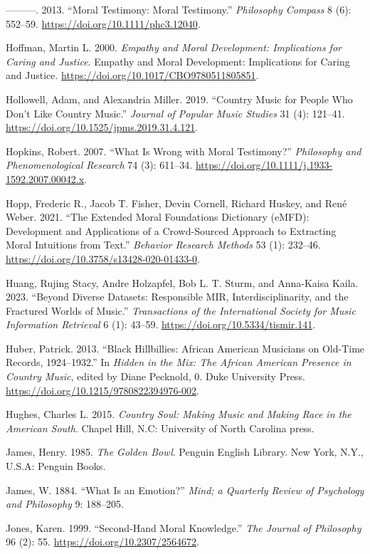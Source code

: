 \documentclass[
  letterpaper,
  DIV=11,
  numbers=noendperiod]{scrartcl}
\theoremstyle{remark}
\begin{document}
---------. 2013. ``Moral Testimony: Moral Testimony.'' \emph{Philosophy
Compass} 8 (6): 552--59. \url{https://doi.org/10.1111/phc3.12040}.

Hoffman, Martin L. 2000. \emph{Empathy and Moral Development:
Implications for Caring and Justice}. Empathy and Moral Development:
Implications for Caring and Justice.
\url{https://doi.org/10.1017/CBO9780511805851}.

Hollowell, Adam, and Alexandria Miller. 2019. ``Country Music for People
Who Don't Like Country Music.'' \emph{Journal of Popular Music Studies}
31 (4): 121--41. \url{https://doi.org/10.1525/jpms.2019.31.4.121}.

Hopkins, Robert. 2007. ``What Is Wrong with Moral Testimony?''
\emph{Philosophy and Phenomenological Research} 74 (3): 611--34.
\url{https://doi.org/10.1111/j.1933-1592.2007.00042.x}.

Hopp, Frederic R., Jacob T. Fisher, Devin Cornell, Richard Huskey, and
René Weber. 2021. ``The Extended Moral Foundations Dictionary (eMFD):
Development and Applications of a Crowd-Sourced Approach to Extracting
Moral Intuitions from Text.'' \emph{Behavior Research Methods} 53 (1):
232--46. \url{https://doi.org/10.3758/s13428-020-01433-0}.

Huang, Rujing Stacy, Andre Holzapfel, Bob L. T. Sturm, and Anna-Kaisa
Kaila. 2023. ``Beyond Diverse Datasets: Responsible MIR,
Interdisciplinarity, and the Fractured Worlds of Music.''
\emph{Transactions of the International Society for Music Information
Retrieval} 6 (1): 43--59. \url{https://doi.org/10.5334/tismir.141}.

Huber, Patrick. 2013. ``Black Hillbillies: African American Musicians on
Old-Time Records, 1924--1932.'' In \emph{Hidden in the Mix: The African
American Presence in Country Music}, edited by Diane Pecknold, 0. Duke
University Press. \url{https://doi.org/10.1215/9780822394976-002}.

Hughes, Charles L. 2015. \emph{Country Soul: Making Music and Making
Race in the American South}. Chapel Hill, N.C: University of North
Carolina press.

James, Henry. 1985. \emph{The Golden Bowl}. Penguin English Library. New
York, N.Y., U.S.A: Penguin Books.

James, W. 1884. ``What Is an Emotion?'' \emph{Mind; a Quarterly Review
of Psychology and Philosophy} 9: 188--205.

Jones, Karen. 1999. ``Second-Hand Moral Knowledge.'' \emph{The Journal
of Philosophy} 96 (2): 55. \url{https://doi.org/10.2307/2564672}.
\end{document}
